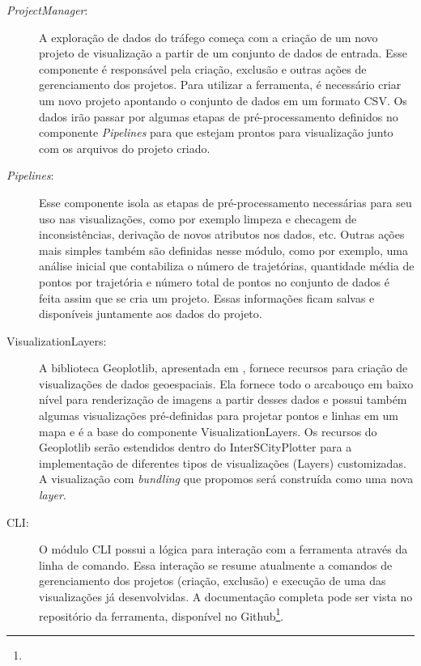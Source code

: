 \begin{description}
  \item[\emph{ProjectManager}:] A exploração de dados do tráfego começa com a criação de um
novo projeto de visualização a partir de um conjunto de dados de entrada. Esse
componente é responsável pela criação, exclusão e outras ações de gerenciamento
dos projetos. Para utilizar a ferramenta, é necessário criar um novo projeto
apontando o conjunto de dados em um formato CSV. Os dados irão passar por algumas
etapas de pré-processamento definidos no componente \emph{Pipelines} para que
estejam prontos para visualização junto com os arquivos do projeto criado.

  \item[\emph{Pipelines}:] Esse componente isola as
etapas de pré-processamento necessárias para seu uso nas visualizações, como
por exemplo limpeza e checagem de inconsistências, derivação de novos
atributos nos dados, etc. Outras ações mais simples também são definidas nesse módulo,
como por exemplo, uma análise inicial que contabiliza o número de trajetórias,
quantidade média de pontos por trajetória e número total de pontos no conjunto
de dados é feita assim que se cria um projeto. Essas informações ficam salvas
e disponíveis juntamente aos dados do projeto.

  \item[VisualizationLayers:] A biblioteca Geoplotlib, apresentada em
\citet{Andrea2016}, fornece recursos para criação de visualizações de dados
geoespaciais. Ela fornece todo o arcabouço em baixo nível para renderização de
imagens a partir desses dados e possui também algumas visualizações
pré-definidas para projetar pontos e linhas em um mapa e é a base do componente
VisualizationLayers. Os recursos do Geoplotlib serão estendidos dentro do
InterSCityPlotter para a implementação de diferentes tipos de visualizações
(Layers) customizadas. A visualização com \emph{bundling} que propomos será
construída como uma nova \emph{layer}.

  \item[CLI:] O módulo CLI possui a lógica para interação com a ferramenta
através da linha de comando. Essa interação se resume atualmente a comandos de
gerenciamento dos projetos (criação, exclusão) e execução de uma das
visualizações já desenvolvidas. A documentação completa pode ser vista no
repositório da ferramenta, disponível no
Github\footnote{}.

\end{description}

